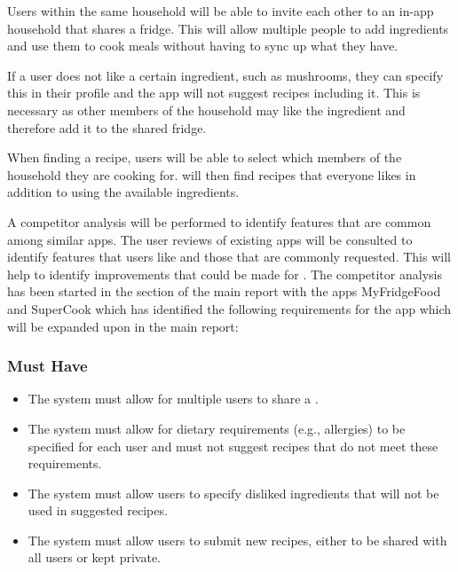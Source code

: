 \documentclass[../CHEFCookingHelper.tex]{subfiles}
\begin{document}
Users within the same household will be able to invite each other to an in-app household that shares a fridge.
This will allow multiple people to add ingredients and use them to cook meals without having to sync up
what they have.

If a user does not like a certain ingredient, such as mushrooms, they can specify this in their profile and
the \chef{} app will not suggest recipes including it. This is necessary as other members of the household
may like the ingredient and therefore add it to the shared fridge.

When finding a recipe, users will be able to select which members of the household they are cooking for.
\chef{} will then find recipes that everyone likes in addition to using the available ingredients.

A competitor analysis will be performed to identify features that are common among similar apps. The user reviews of existing apps
will be consulted to identify features that users like and those that are commonly requested. This will help to identify
improvements that could be made for \chef{}. The competitor analysis has been started in the 
section of the main report with the apps MyFridgeFood \cite{myfridgefood_myfridgefood_nodate} and SuperCook
\cite{supercook_supercook_nodate} which has identified the following
requirements for the \chef{} app which will be expanded upon in the main report:

\subsubsection{Must Have}
\begin{itemize}
    \item The system must allow for multiple users to share a \virtualfridge.
    \item The system must allow for dietary requirements (e.g., allergies) to be specified for each user and must not suggest recipes that do not meet these requirements.
    \item The system must allow users to specify disliked ingredients that will not be used in suggested recipes.
    \item The system must allow users to submit new recipes, either to be shared with all users or kept private.
\end{itemize}
\end{document}
